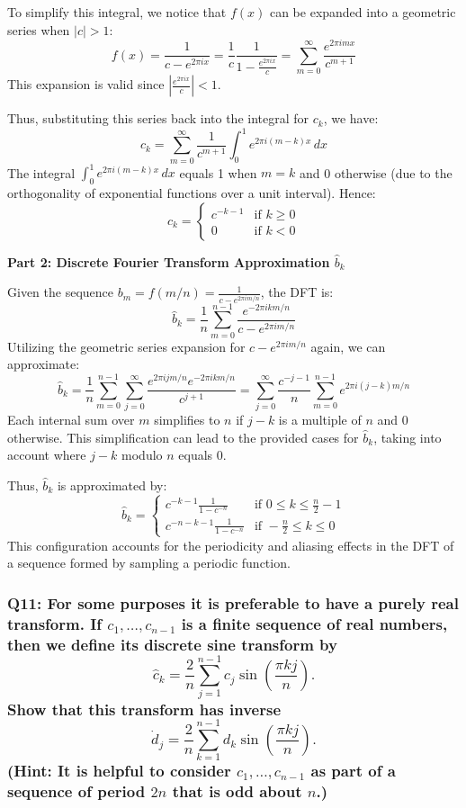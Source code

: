 \documentclass[8pt]{article}
\begin{document}
To simplify this integral, we notice that \(f(x)\) can be expanded into a geometric series when \(|c| > 1\):
\[
f(x) = \frac{1}{c - e^{2\pi ix}} = \frac{1}{c} \frac{1}{1 - \frac{e^{2\pi ix}}{c}} = \sum_{m=0}^\infty \frac{e^{2\pi i mx}}{c^{m+1}}
\]
This expansion is valid since \( \left|\frac{e^{2\pi ix}}{c}\right| < 1 \).

Thus, substituting this series back into the integral for \(c_k\), we have:
\[
c_k = \sum_{m=0}^\infty \frac{1}{c^{m+1}} \int_0^1 e^{2\pi i (m-k) x} \, dx
\]
The integral \(\int_0^1 e^{2\pi i (m-k) x} \, dx\) equals 1 when \(m = k\) and 0 otherwise (due to the orthogonality of exponential functions over a unit interval). Hence:
\[
c_k = \begin{cases}
c^{-k-1} & \text{if } k \geq 0 \\
0 & \text{if } k < 0
\end{cases}
\]

\textbf{Part 2: Discrete Fourier Transform Approximation \(\hat{b}_k\)}

Given the sequence \(b_m = f(m/n) = \frac{1}{c - e^{2\pi i m/n}}\), the DFT is:
\[
\hat{b}_k = \frac{1}{n} \sum_{m=0}^{n-1} \frac{e^{-2\pi i k m/n}}{c - e^{2\pi i m/n}}
\]
Utilizing the geometric series expansion for \(c - e^{2\pi i m/n}\) again, we can approximate:
\[
\hat{b}_k = \frac{1}{n} \sum_{m=0}^{n-1} \sum_{j=0}^\infty \frac{e^{2\pi i j m/n} e^{-2\pi i k m/n}}{c^{j+1}} = \sum_{j=0}^\infty \frac{c^{-j-1}}{n} \sum_{m=0}^{n-1} e^{2\pi i (j-k) m/n}
\]
Each internal sum over \(m\) simplifies to \(n\) if \(j-k\) is a multiple of \(n\) and 0 otherwise. This simplification can lead to the provided cases for \(\hat{b}_k\), taking into account where \(j-k\) modulo \(n\) equals 0.

Thus, \(\hat{b}_k\) is approximated by:
\[
\hat{b}_k = \begin{cases}
c^{-k-1} \frac{1}{1 - c^{-n}} & \text{if } 0 \leq k \leq \frac{n}{2} - 1 \\
c^{-n-k-1} \frac{1}{1 - c^{-n}} & \text{if } -\frac{n}{2} \leq k \leq 0
\end{cases}
\]
This configuration accounts for the periodicity and aliasing effects in the DFT of a sequence formed by sampling a periodic function.

\subsubsection*{Q11:
For some purposes it is preferable to have a purely real transform. If \(c_1, \ldots, c_{n-1}\) is a finite sequence of real numbers, then we define its discrete sine transform by
\[
\hat{c}_k = \frac{2}{n} \sum_{j=1}^{n-1} c_j \sin \left( \frac{\pi kj}{n} \right).
\]
Show that this transform has inverse
\[
\dot{d}_j = \frac{2}{n} \sum_{k=1}^{n-1} d_k \sin \left( \frac{\pi kj}{n} \right).
\]
(Hint: It is helpful to consider \(c_1, \ldots, c_{n-1}\) as part of a sequence of period \(2n\) that is odd about \(n\).)}
\end{document}
